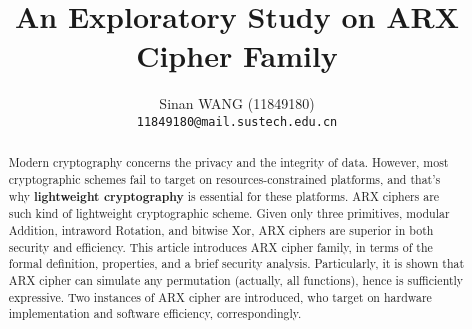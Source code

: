\documentclass[10pt,twocolumn,letterpaper]{article}
\theoremstyle{definition}
\begin{document}
\title{An Exploratory Study on ARX Cipher Family}

\author{
    Sinan WANG (11849180)\\
    {\tt\small 11849180@mail.sustech.edu.cn}
}

\maketitle

\begin{abstract}
Modern cryptography concerns the privacy and the integrity of data. However, most
cryptographic schemes fail to target on resources-constrained platforms, and that's
why \textbf{lightweight cryptography} is essential for these platforms. ARX ciphers
are such kind of lightweight cryptographic scheme. Given only three primitives,
modular Addition, intraword Rotation, and bitwise Xor, ARX ciphers are superior in
both security and efficiency. This article introduces ARX cipher family, in terms
of the formal definition, properties, and a brief security analysis. Particularly,
it is shown that ARX cipher can simulate any permutation (actually, all functions),
hence is sufficiently expressive. Two instances of ARX cipher are introduced, who
target on hardware implementation and software efficiency, correspondingly.
\end{abstract}







\newpage
{\small}
\newpage

\end{document}
